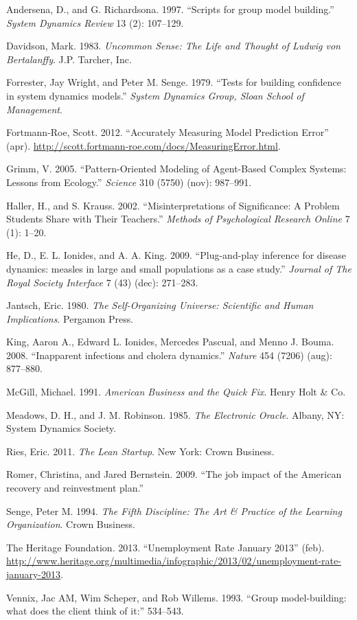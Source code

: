 \documentclass[]{memoir}
\begin{document}
Andersena, D., and G. Richardsona. 1997. ``Scripts for group model
building.'' \emph{System Dynamics Review} 13 (2): 107--129.

Davidson, Mark. 1983. \emph{Uncommon Sense: The Life and Thought of
Ludwig von Bertalanffy}. J.P. Tarcher, Inc.

Forrester, Jay Wright, and Peter M. Senge. 1979. ``Tests for building
confidence in system dynamics models.'' \emph{System Dynamics Group,
Sloan School of Management}.

Fortmann-Roe, Scott. 2012. ``Accurately Measuring Model Prediction
Error'' (apr).
\url{http://scott.fortmann-roe.com/docs/MeasuringError.html}.

Grimm, V. 2005. ``Pattern-Oriented Modeling of Agent-Based Complex
Systems: Lessons from Ecology.'' \emph{Science} 310 (5750) (nov):
987--991.

Haller, H., and S. Krauss. 2002. ``Misinterpretations of Significance: A
Problem Students Share with Their Teachers.'' \emph{Methods of
Psychological Research Online} 7 (1): 1--20.

He, D., E. L. Ionides, and A. A. King. 2009. ``Plug-and-play inference
for disease dynamics: measles in large and small populations as a case
study.'' \emph{Journal of The Royal Society Interface} 7 (43) (dec):
271--283.

Jantsch, Eric. 1980. \emph{The Self-Organizing Universe: Scientific and
Human Implications}. Pergamon Press.

King, Aaron A., Edward L. Ionides, Mercedes Pascual, and Menno J. Bouma.
2008. ``Inapparent infections and cholera dynamics.'' \emph{Nature} 454
(7206) (aug): 877--880.

McGill, Michael. 1991. \emph{American Business and the Quick Fix}. Henry
Holt \& Co.

Meadows, D. H., and J. M. Robinson. 1985. \emph{The Electronic Oracle}.
Albany, NY: System Dynamics Society.

Ries, Eric. 2011. \emph{The Lean Startup}. New York: Crown Business.

Romer, Christina, and Jared Bernstein. 2009. ``The job impact of the
American recovery and reinvestment plan.''

Senge, Peter M. 1994. \emph{The Fifth Discipline: The Art \& Practice of
the Learning Organization}. Crown Business.

The Heritage Foundation. 2013. ``Unemployment Rate January 2013'' (feb).
\url{http://www.heritage.org/multimedia/infographic/2013/02/unemployment-rate-january-2013}.

Vennix, Jac AM, Wim Scheper, and Rob Willems. 1993. ``Group
model-building: what does the client think of it:'' 534--543.
\end{document}
